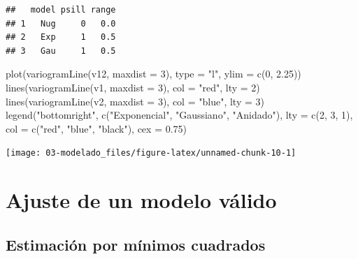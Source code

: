 \documentclass[
  spanish,
]{book}
\newenvironment{Shaded}{\begin{snugshade}}{\end{snugshade}}
\newcommand{\AttributeTok}[1]{\textcolor[rgb]{0.77,0.63,0.00}{#1}}
\newcommand{\DecValTok}[1]{\textcolor[rgb]{0.00,0.00,0.81}{#1}}
\newcommand{\FloatTok}[1]{\textcolor[rgb]{0.00,0.00,0.81}{#1}}
\newcommand{\FunctionTok}[1]{\textcolor[rgb]{0.00,0.00,0.00}{#1}}
\newcommand{\NormalTok}[1]{#1}
\newcommand{\StringTok}[1]{\textcolor[rgb]{0.31,0.60,0.02}{#1}}
\theoremstyle{break}
\begin{document}
\begin{verbatim}
##   model psill range
## 1   Nug     0   0.0
## 2   Exp     1   0.5
## 3   Gau     1   0.5
\end{verbatim}

\begin{Shaded}
\begin{Highlighting}[]
\FunctionTok{plot}\NormalTok{(}\FunctionTok{variogramLine}\NormalTok{(v12, }\AttributeTok{maxdist =} \DecValTok{3}\NormalTok{), }\AttributeTok{type =} \StringTok{"l"}\NormalTok{, }\AttributeTok{ylim =} \FunctionTok{c}\NormalTok{(}\DecValTok{0}\NormalTok{, }\FloatTok{2.25}\NormalTok{))}
\FunctionTok{lines}\NormalTok{(}\FunctionTok{variogramLine}\NormalTok{(v1, }\AttributeTok{maxdist =} \DecValTok{3}\NormalTok{), }\AttributeTok{col =} \StringTok{"red"}\NormalTok{, }\AttributeTok{lty =} \DecValTok{2}\NormalTok{)}
\FunctionTok{lines}\NormalTok{(}\FunctionTok{variogramLine}\NormalTok{(v2, }\AttributeTok{maxdist =} \DecValTok{3}\NormalTok{), }\AttributeTok{col =} \StringTok{"blue"}\NormalTok{, }\AttributeTok{lty =} \DecValTok{3}\NormalTok{)}
\FunctionTok{legend}\NormalTok{(}\StringTok{"bottomright"}\NormalTok{, }\FunctionTok{c}\NormalTok{(}\StringTok{"Exponencial"}\NormalTok{, }\StringTok{"Gaussiano"}\NormalTok{, }\StringTok{"Anidado"}\NormalTok{), }\AttributeTok{lty =} \FunctionTok{c}\NormalTok{(}\DecValTok{2}\NormalTok{, }\DecValTok{3}\NormalTok{, }\DecValTok{1}\NormalTok{), }
       \AttributeTok{col =} \FunctionTok{c}\NormalTok{(}\StringTok{"red"}\NormalTok{, }\StringTok{"blue"}\NormalTok{, }\StringTok{"black"}\NormalTok{), }\AttributeTok{cex =} \FloatTok{0.75}\NormalTok{)}
\end{Highlighting}
\end{Shaded}

\begin{center}\texttt{[image: 03-modelado\_files/figure-latex/unnamed-chunk-10-1]} \end{center}

\hypertarget{ajuste-variog}{%
\section{Ajuste de un modelo válido}\label{ajuste-variog}}

\hypertarget{ls-fit}{%
\subsection{Estimación por mínimos cuadrados}\label{ls-fit}}
\end{document}
